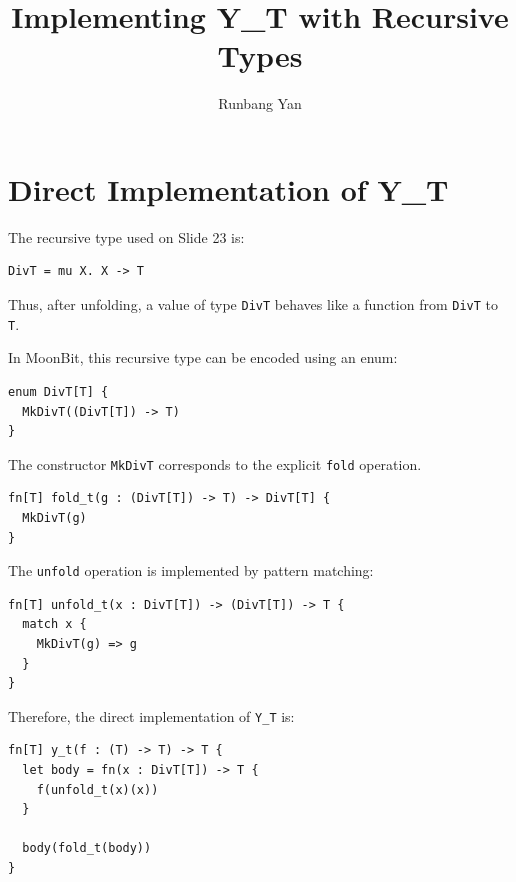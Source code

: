 \documentclass[manuscript]{acmart}
\begin{document}
\title{Implementing Y\_T with Recursive Types}

\author{Runbang Yan}

\renewcommand{\shortauthors}{Yan}

\maketitle

\section{Direct Implementation of Y\_T}

The recursive type used on Slide 23 is:

\begin{lstlisting}
DivT = mu X. X -> T
\end{lstlisting}

Thus, after unfolding, a value of type \texttt{DivT} behaves like a function from \texttt{DivT} to \texttt{T}.

In MoonBit, this recursive type can be encoded using an enum:

\begin{lstlisting}
enum DivT[T] {
  MkDivT((DivT[T]) -> T)
}
\end{lstlisting}

The constructor \texttt{MkDivT} corresponds to the explicit \texttt{fold} operation.

\begin{lstlisting}
fn[T] fold_t(g : (DivT[T]) -> T) -> DivT[T] {
  MkDivT(g)
}
\end{lstlisting}

The \texttt{unfold} operation is implemented by pattern matching:

\begin{lstlisting}
fn[T] unfold_t(x : DivT[T]) -> (DivT[T]) -> T {
  match x {
    MkDivT(g) => g
  }
}
\end{lstlisting}

Therefore, the direct implementation of \texttt{Y\_T} is:

\begin{lstlisting}
fn[T] y_t(f : (T) -> T) -> T {
  let body = fn(x : DivT[T]) -> T {
    f(unfold_t(x)(x))
  }

  body(fold_t(body))
}
\end{lstlisting}
\end{document}
